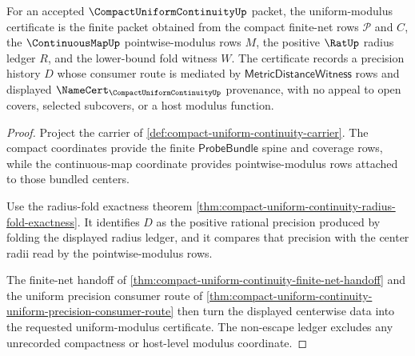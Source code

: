 \begin{theorem}
\label{thm:compact-uniform-continuity-modulus-certificate}
For an accepted $\CompactUniformContinuityUp$ packet, the uniform-modulus certificate is the finite packet obtained from the compact finite-net rows $\mathcal{P}$ and $C$, the $\ContinuousMapUp$ pointwise-modulus rows $M$, the positive $\RatUp$ radius ledger $R$, and the lower-bound fold witness $W$. The certificate records a precision history $D$ whose consumer route is mediated by $\mathsf{MetricDistanceWitness}$ rows and displayed $\NameCert_{\CompactUniformContinuityUp}$ provenance, with no appeal to open covers, selected subcovers, or a host modulus function.
\end{theorem}
\begin{proof}
Project the carrier of \autoref{def:compact-uniform-continuity-carrier}. The compact coordinates provide the finite $\mathsf{ProbeBundle}$ spine and coverage rows, while the continuous-map coordinate provides pointwise-modulus rows attached to those bundled centers.

Use the radius-fold exactness theorem \autoref{thm:compact-uniform-continuity-radius-fold-exactness}. It identifies $D$ as the positive rational precision produced by folding the displayed radius ledger, and it compares that precision with the center radii read by the pointwise-modulus rows.

The finite-net handoff of \autoref{thm:compact-uniform-continuity-finite-net-handoff} and the uniform precision consumer route of \autoref{thm:compact-uniform-continuity-uniform-precision-consumer-route} then turn the displayed centerwise data into the requested uniform-modulus certificate. The non-escape ledger excludes any unrecorded compactness or host-level modulus coordinate.
\end{proof}


